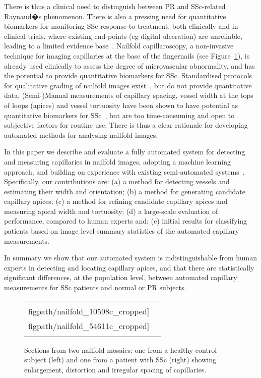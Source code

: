 \documentclass[runningheads,a4paper]{llncs}
\def\figpath{./figs}
\newcommand{\fref}[1]{Figure~\ref{#1}}
\def\figpath{./figs}
\begin{document}
There is thus a clinical need to distinguish between PR and SSc-related Raynaud�s phenomenon. There is also a pressing need for quantitative biomarkers for monitoring SSc response to treatment, both clinically and in clinical trials, where existing end-points (eg digital ulceration) are unreliable, leading to a limited evidence base~\cite{HerrickCOinR2011,HerrickAR2009}. Nailfold capillaroscopy, a non-invasive technique for imaging capillaries at the base of the fingernails (see \fref{f:capillaroscopy}), is already used clinically to assess the degree of microvascular abnormality, and has the potential to provide quantitative biomarkers for SSc. Standardised protocols for qualitative grading of nailfold images exist~\cite{Cutolo_etal_BPRCR08}, but do not provide quantitative data. (Semi-)Manual measurements of capillary spacing, vessel width at the tops of loops (apices) and vessel tortuosity have been shown to have potential as quantitative biomarkers for SSc~\cite{Murray_etal_AR09}, but are too time-consuming and open to subjective factors for routine use. There is thus a clear rationale for developing automated methods for analysing nailfold images.

In this paper we describe and evaluate a fully automated system for detecting and measuring capillaries in nailfold images, adopting a machine learning approach, and building on experience with existing semi-automated systems~\cite{Murray_etal_AR09,Paradowski_etal_KES09b}. Specifically, our contributions are: (a) a method for detecting vessels and estimating their width and orientation; (b) a method for generating candidate capillary apices; (c) a method for refining candidate capillary apices and measuring apical width and tortuosity; (d) a large-scale evaluation of performance, compared to human experts and; (e) initial results for classifying patients based on image level summary statistics of the automated capillary measurements.

In summary we show that our automated system is indistinguishable from human experts in detecting and locating capillary apices, and that there are statistically significant differences, at the population level, between automated capillary measurements for SSc patients and normal or PR subjects.

\begin{figure}[t]
\centering
\begin{tabular}{@{}c@{} @{}c@{}}
\texttt{[image: \\figpath/nailfold\_10598c\_cropped]}
\texttt{[image: \\figpath/nailfold\_54611c\_cropped]} \\
\noalign{\smallskip}
\end{tabular}
%
\caption{Sections from two nailfold mosaics: one from a healthy control subject (left) and one from a patient with SSc (right) showing enlargement, distortion and irregular spacing of capillaries.}
\label{f:capillaroscopy}
\end{figure}
%
\end{document}
